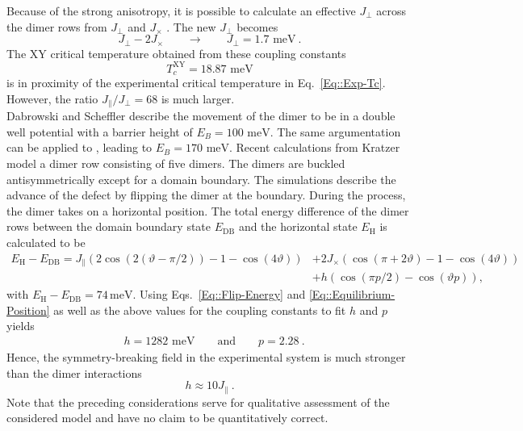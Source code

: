 	Because of the strong anisotropy, it is possible to calculate an effective $J_\perp$ across the dimer rows from $J_\perp$ and $J_\times$ \cite{brand2023dimer}. The new $J_\perp$ becomes 
	\begin{equation}
		J_\perp - 2 J_\times \qquad \rightarrow  \qquad J_\perp =	1.7 \text{ meV} ~.
	\end{equation}
	The XY critical temperature obtained from these coupling constants 
	\begin{equation}
		T_c^{\text{XY}} =	18.87 \text{ meV}
	\end{equation}
	is in proximity of the experimental critical temperature in Eq.~\eqref{Eq::Exp-Tc}. However, the ratio $J_\parallel /	J_\perp = 68$ is much larger.\\
	
	Dabrowski and Scheffler \cite{dabrowski1992self} describe the movement of the dimer to be in a double well potential with a barrier height of $E_B =	100 \text{ meV}$. The same argumentation can be applied to \cite{inoue1994order}, leading to $E_B =	170 \text{ meV}$. Recent calculations from Kratzer \cite{kratzer2024flip} model a dimer row consisting of five dimers. The dimers are buckled antisymmetrically  except for a domain boundary. The simulations describe the advance of the defect by flipping the dimer at the boundary. During the process, the dimer takes on a horizontal position. The total energy difference of the dimer rows between the domain boundary state $E_{\text{DB}}$ and the horizontal state $E_\text{H}$ is calculated to be 
	\begin{equation} \label{Eq::Flip-Energy}
		\begin{split}
			E_\text{H} - E_{\text{DB}} = J_\parallel \left(2 \cos ( 2 (\vartheta - \pi / 2)) -1 - \cos(4 \vartheta)\right) &+ 2 J_\times \left(\cos(\pi + 2 \vartheta) - 1 - \cos(4 \vartheta) \right) \\
			&+ h \left(\cos(\pi p /	2) - \cos(\vartheta p)\right),
		\end{split}
	\end{equation}
	with $E_\text{H} - E_\text{DB} =	74\, \text{meV}$. Using Eqs.~\eqref{Eq::Flip-Energy} and \eqref{Eq::Equilibrium-Position} as well as the above values for the coupling constants  to fit $h$ and $p$ yields
	\begin{align}
		&h =	1282 \text{ meV} \qquad \text{and} \qquad p =	2.28~.
	\end{align}
	Hence, the symmetry-breaking field in the experimental system is much stronger than the dimer interactions 
	\begin{equation} \label{Eq::h-J-ratio}
		h \approx 10 J_\parallel~.
	\end{equation}
	Note that the preceding considerations serve for qualitative assessment of the considered model and have no claim to be quantitatively correct.
	

